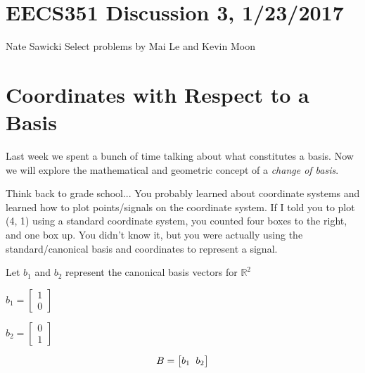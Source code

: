 \documentclass[11pt]{article}
\begin{document}
\section*{EECS351 Discussion 3, 1/23/2017}
Nate Sawicki \newline
Select problems by Mai Le and Kevin Moon

\section{Coordinates with Respect to a Basis}
Last week we spent a bunch of time talking about what constitutes a basis. Now we will explore the mathematical and geometric concept of a \emph{change of basis}.

\vspace{5mm}
Think back to grade school... You probably learned about coordinate systems and learned how to plot points/signals on the coordinate system. If I told you to plot (4, 1) using a standard coordinate system, you counted four boxes to the right, and one box up. You didn't know it, but you were actually using the standard/canonical basis and coordinates to represent a signal.\newline

Let $b_1$ and $b_2$ represent the canonical basis vectors for $\mathbb{R}^2$\newline

\begin{center}

 
$
b_1 = 
\begin{bmatrix}

1 \\
0

\end{bmatrix}
$
\end{center}

\begin{center}

 
$
b_2 = 
\begin{bmatrix}

0 \\
1

\end{bmatrix}
$
\end{center}




\vspace{5mm}

\begin{center}
\[
B = 
\begin{bmatrix}
  b_1 \hspace{2mm} b_2            
\end{bmatrix}
\]
\end{center}
\end{document}
